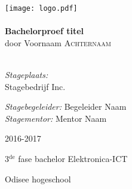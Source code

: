 \begin{titlepage}
\begin{center}
\texttt{[image: logo.pdf]}~\\[1cm]

\HRule \\[0.4cm]
{ \LARGE \bfseries Bachelorproef titel}\\[0.4cm]
{door Voornaam \textsc{Achternaam}}\\[0.2cm]

\HRule \\[1.5cm]

\begin{minipage}{0.49\textwidth}
\begin{flushleft} \large
\emph{Stageplaats:}\\
Stagebedrijf Inc.\\

\end{flushleft}
\end{minipage}
\begin{minipage}{0.49\textwidth}
\begin{flushright} \large
\emph{Stagebegeleider:}
Begeleider Naam\\
\emph{Stagementor:}
Mentor Naam\\
\end{flushright}
\end{minipage}

\vfill

{\large 2016-2017}

{\large{3$^{\text{de}}$ fase bachelor Elektronica-ICT}}

{\large Odisee hogeschool}

\end{center}
\end{titlepage}
